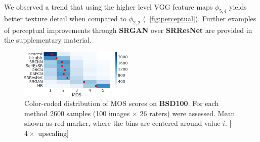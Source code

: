 \documentclass[10pt,twocolumn,letterpaper]{article}
\begin{document}
 	We observed a trend that using the higher level VGG feature maps $\phi_{5,4}$ yields better texture detail when compared to $\phi_{2,2}$ (\cf \figurename~\ref{fig:perceptual}).
	Further examples of perceptual improvements through \textbf{SRGAN} over \textbf{SRResNet} are provided in the supplementary material.
\begin{figure}[ht!] 
     	\includegraphics[width=0.48\textwidth]{images/used/jpg/MOS_heatmapcropped}
  		\caption{Color-coded distribution of MOS scores on \textbf{BSD100}. For each method 2600 samples (100 images $\times$ 26 raters) were assessed. Mean shown as red marker, where the bins are centered around value $i$. [$4\times$ upscaling]} 
	\label{fig:MOS}
\end{figure}
\end{document}
